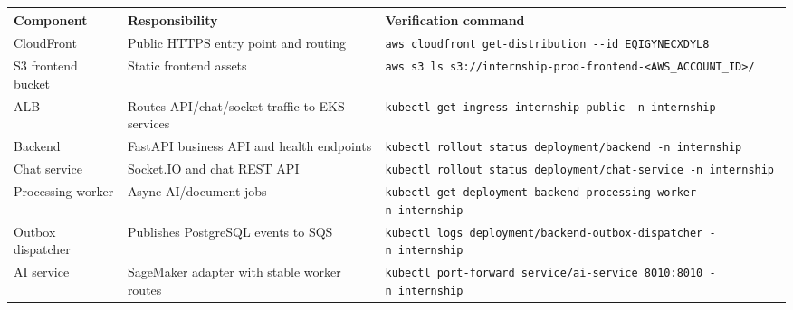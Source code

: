 {
\begingroup
\small
\setlength{\tabcolsep}{3pt}
\renewcommand{\arraystretch}{1.15}
\begin{longtable}{@{}
  >{\raggedright\arraybackslash}p{}
  >{\raggedright\arraybackslash}p{}
  >{\raggedright\arraybackslash}p{}@{}}
\toprule\noalign{}
\begin{minipage}[b]{\linewidth}\raggedright
Component
\end{minipage} & \begin{minipage}[b]{\linewidth}\raggedright
Responsibility
\end{minipage} & \begin{minipage}[b]{\linewidth}\raggedright
Verification command
\end{minipage} \\
\midrule\noalign{}
\endhead
\bottomrule\noalign{}
\endlastfoot
CloudFront & Public HTTPS entry point and routing &
\texttt{aws\ cloudfront\ get-\allowbreak{}distribution\ -\/\allowbreak{}-id\ EQIGYNECXDYL8} \\
S3 frontend bucket & Static frontend assets &
\texttt{aws\ s3\ ls\ s3:/\allowbreak{}/\allowbreak{}internship-\allowbreak{}prod-\allowbreak{}frontend-\textless{}AWS\_\allowbreak{}ACCOUNT\_\allowbreak{}ID\textgreater{}/\allowbreak{}} \\
ALB & Routes API/chat/socket traffic to EKS services &
\texttt{kubectl\ get\ ingress\ internship-\allowbreak{}public\ -n\ internship} \\
Backend & FastAPI business API and health endpoints &
\texttt{kubectl\ rollout\ status\ deployment/\allowbreak{}backend\ -n\ internship} \\
Chat service & Socket.IO and chat REST API &
\texttt{kubectl\ rollout\ status\ deployment/\allowbreak{}chat-\allowbreak{}service\ -n\ internship} \\
Processing worker & Async AI/document jobs &
\texttt{kubectl\ get\ deployment\ backend-\allowbreak{}processing-\allowbreak{}worker\ -n\ internship} \\
Outbox dispatcher & Publishes PostgreSQL events to SQS &
\texttt{kubectl\ logs\ deployment/\allowbreak{}backend-\allowbreak{}outbox-\allowbreak{}dispatcher\ -n\ internship} \\
AI service & SageMaker adapter with stable worker routes &
\texttt{kubectl\ port-\allowbreak{}forward\ service/\allowbreak{}ai-\allowbreak{}service\ 8010:8010\ -n\ internship} \\

\end{longtable}}
